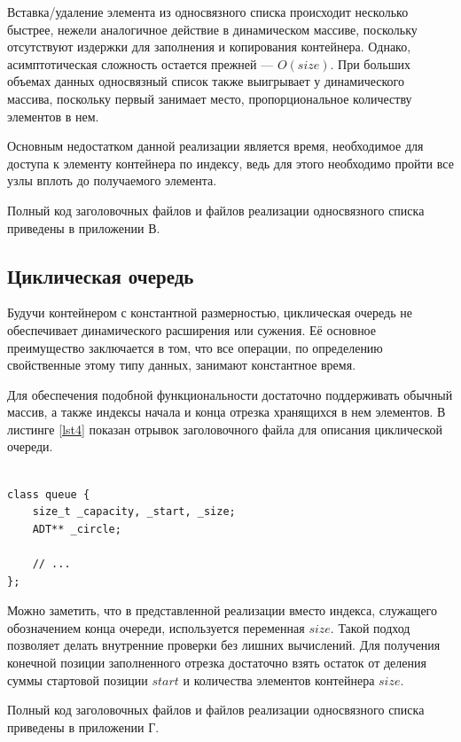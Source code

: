\documentclass[a4paper,12pt]{article}
\begin{document}
Вставка/удаление элемента из односвязного списка происходит несколько быстрее, нежели аналогичное действие в динамическом массиве, поскольку отсутствуют издержки для заполнения и копирования контейнера.
Однако, асимптотическая сложность остается прежней — $O(size)$.
При больших объемах данных односвязный список также выигрывает у динамического массива, поскольку первый занимает место, пропорциональное количеству элементов в нем.

Основным недостатком данной реализации является время, необходимое для доступа к элементу контейнера по индексу, ведь для этого необходимо пройти все узлы вплоть до получаемого элемента.

Полный код заголовочных файлов и файлов реализации односвязного списка приведены в приложении В.

\cleardoublepage

\subsection{Циклическая очередь}

Будучи контейнером с константной размерностью, циклическая очередь не обеспечивает динамического расширения или сужения.
Её основное преимущество заключается в том, что все операции, по определению свойственные этому типу данных, занимают константное время.

Для обеспечения подобной функциональности достаточно поддерживать обычный массив, а также индексы начала и конца отрезка хранящихся в нем элементов.
В листинге \ref{lst4} показан отрывок заголовочного файла для описания циклической очереди.

\begin{lstlisting}[caption={Отрывок заголовочного файла для описания циклической очереди},label=lst4]

class queue {
	size_t _capacity, _start, _size;
	ADT** _circle;
	
	// ...
};

\end{lstlisting}

Можно заметить, что в представленной реализации вместо индекса, служащего обозначением конца очереди, используется переменная $size$.
Такой подход позволяет делать внутренние проверки без лишних вычислений.
Для получения конечной позиции заполненного отрезка достаточно взять остаток от деления суммы стартовой позиции $start$ и количества элементов контейнера $size$.

Полный код заголовочных файлов и файлов реализации односвязного списка приведены в приложении Г.
\end{document}
